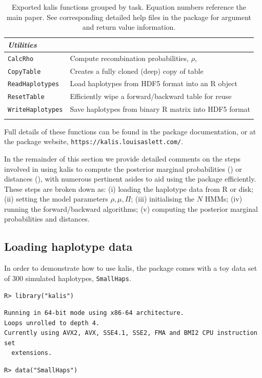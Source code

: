 \documentclass[a4paper]{article}
\let\proglang=\textsf
\newcommand{\pkg}[1]{{\fontseries{m}\fontseries{b}\selectfont #1}}
\begin{document}
\begin{longtable}{ll}
	\midrule
	\multicolumn{2}{l}{\emph{Utilities}} \\
	\midrule
	\texttt{CalcRho} & Compute recombination probabilities, $\rho$, \Cref{mainpaper:eq:rho} \\
	\texttt{CopyTable} & Creates a fully cloned (deep) copy of table \\
	\texttt{ReadHaplotypes} & Load haplotypes from HDF5 format into an R object \\
	\texttt{ResetTable} & Efficiently wipe a forward/backward table for reuse \\
	\texttt{WriteHaplotypes} & Save haplotypes from binary R matrix into HDF5 format \\
	\bottomrule
	\caption{
	  Exported \pkg{kalis} functions grouped by task.
	  Equation numbers reference the main paper.
	  See corresponding detailed help files in the package for argument and return value information.}
	\label{table:function_table}
\end{longtable}

Full details of these functions can be found in the package documentation, or at the package website, \texttt{https://kalis.louisaslett.com/}.

In the remainder of this section we provide detailed comments on the steps involved in using \pkg{kalis} to compute the posterior marginal probabilities () or distances (), with numerous pertinent asides to aid using the package efficiently.
These steps are broken down as: (i) loading the haplotype data from \proglang{R} or disk; (ii) setting the model parameters \(\rho, \mu, \Pi\); (iii) initialising the \(N\) HMMs; (iv) running the forward/backward algorithms; (v) computing the posterior marginal probabilities and distances.



\subsection*{Loading haplotype data}
\label{sec:loadinghaps}

In order to demonstrate how to use \pkg{kalis}, the package comes with a toy data set of 300 simulated haplotypes, \texttt{SmallHaps}.

\begin{verbatim}
R> library("kalis")
\end{verbatim}
\begin{verbatim}
Running in 64-bit mode using x86-64 architecture.
Loops unrolled to depth 4.
Currently using AVX2, AVX, SSE4.1, SSE2, FMA and BMI2 CPU instruction set
  extensions.
\end{verbatim}
\begin{verbatim}
R> data("SmallHaps")
\end{verbatim}
\end{document}
